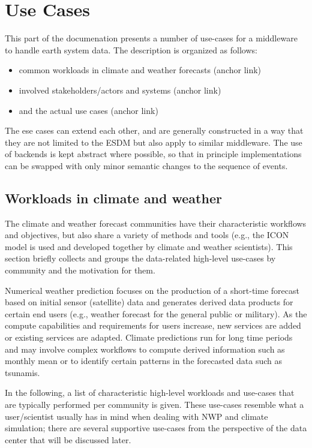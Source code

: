 \section{Use Cases}
This part of the documenation presents a number of use-cases for a middleware to handle earth system data.
The description is organized as follows:

\begin{itemize}
  \item common workloads in climate and weather forecasts (anchor link)
  \item involved stakeholders/actors and systems (anchor link)
  \item and the actual use cases (anchor link)
\end{itemize}

The ese cases can extend each other, and are generally constructed in a way that they are not limited to the ESDM but also apply to similar middleware. The use of backends is kept abstract where possible, so that in principle implementations can be swapped with only minor semantic changes to the sequence of events.

\subsection{ Workloads in climate and weather}
The climate and weather forecast communities have their characteristic workflows and objectives, but also share a variety of methods and tools (e.g., the ICON model is used and developed together by climate and weather scientists).
This section briefly collects and groups the data-related high-level use-cases by community and the motivation for them.

Numerical weather prediction focuses on the production of a short-time forecast based on initial sensor (satellite) data and generates derived data products for certain end users (e.g., weather forecast for the general public or military). 
As the compute capabilities and requirements for users increase, new services are added or existing services are adapted.
Climate predictions run for long time periods and may involve complex workflows to compute derived information such as monthly mean or to identify certain patterns in the forecasted data such as tsunamis.

In the following, a list of characteristic high-level workloads and use-cases that are typically performed per community is given.
These use-cases resemble what a user/scientist usually has in mind when dealing with NWP and climate simulation; there are several supportive use-cases from the perspective of the data center that will be discussed later.


